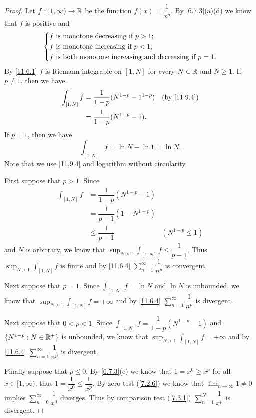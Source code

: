 \begin{proof}
  Let \(f : [1, \infty) \to \mathbb{R}\) be the function \(f(x) = \dfrac{1}{x^p}\).
  By \cref{6.7.3}(a)(d) we know that \(f\) is positive and
  \[
    \begin{dcases}
      f \text{ is monotone decreasing if } p > 1; \\
      f \text{ is monotone increasing if } p < 1; \\
      f \text{ is both monotone increasing and decreasing if } p = 1.
    \end{dcases}
  \]
  By \cref{11.6.1} \(f\) is Riemann integrable on \([1, N]\) for every \(N \in \mathbb{R}\) and \(N \geq 1\).
  If \(p \neq 1\), then we have
  \begin{align*}
    \int_{[1, N]} f & = \dfrac{1}{1 - p} (N^{1 - p} - 1^{1 - p}) &  & \text{(by \cref{11.9.4})} \\
                    & = \dfrac{1}{1 - p} (N^{1 - p} - 1).
  \end{align*}
  If \(p = 1\), then we have
  \[
    \int_{[1, N]} f = \ln N - \ln 1 = \ln N.
  \]
  Note that we use \cref{11.9.4} and logarithm without circularity.

  First suppose that \(p > 1\).
  Since
  \begin{align*}
    \int_{[1, N]} f & = \dfrac{1}{1 - p} (N^{1 - p} - 1)                      \\
                    & = \dfrac{1}{p - 1} (1 - N^{1 - p})                      \\
                    & \leq \dfrac{1}{p - 1}              & (N^{1 - p} \leq 1)
  \end{align*}
  and \(N\) is arbitrary, we know that \(\sup_{N > 1} \int_{[1, N]} f \leq \dfrac{1}{p - 1}\).
  Thus \(\sup_{N > 1} \int_{[1, N]} f\) is finite and by \cref{11.6.4} \(\sum_{n = 1}^\infty \dfrac{1}{n^p}\) is convergent.

  Next suppose that \(p = 1\).
  Since \(\int_{[1, N]} f = \ln N\) and \(\ln N\) is unbounded, we know that \(\sup_{N > 1} \int_{[1, N]} f = +\infty\) and by \cref{11.6.4} \(\sum_{n = 1}^\infty \dfrac{1}{n^p}\) is divergent.

  Next suppose that \(0 < p < 1\).
  Since \(\int_{[1, N]} f = \dfrac{1}{1 - p} (N^{1 - p} - 1)\) and \(\{N^{1 - p} : N \in \mathbb{R}^+\}\) is unbounded, we know that \(\sup_{N > 1} \int_{[1, N]} f = +\infty\) and by \cref{11.6.4} \(\sum_{n = 1}^\infty \dfrac{1}{n^p}\) is divergent.

  Finally suppose that \(p \leq 0\).
  By \cref{6.7.3}(e) we know that \(1 = x^0 \geq x^p\) for all \(x \in [1, \infty)\), thus \(1 = \dfrac{1}{x^0} \leq \dfrac{1}{x^p}\).
  By zero test (\cref{7.2.6}) we know that \(\lim_{n \to \infty} 1 \neq 0\) implies \(\sum_{n = 0}^\infty \dfrac{1}{x^0}\) diverges.
  Thus by comparison test (\cref{7.3.1}) \(\sum_{n = 1}^N \dfrac{1}{x^p}\) is divergent.
\end{proof}

